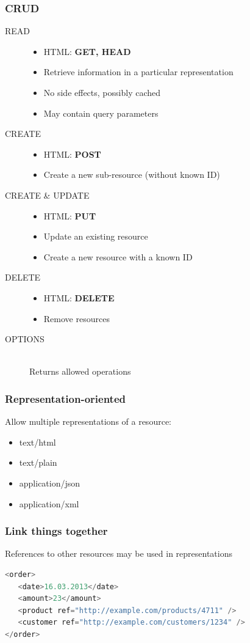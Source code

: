 \documentclass[10pt]{article}
\begin{document}
\subsubsection{CRUD}
\begin{description}
	\item[READ] \hfill
	\begin{itemize}
		\item HTML: \textbf{GET, HEAD}
		\item Retrieve information in a particular representation
		\item No side effects, possibly cached
		\item May contain query parameters
	\end{itemize}
	\item[CREATE] \hfill
	\begin{itemize}
		\item HTML: \textbf{POST}
		\item Create a new sub-resource (without known ID)
	\end{itemize}
	\item[CREATE \& UPDATE] \hfill
	\begin{itemize}
		\item HTML: \textbf{PUT}
		\item Update an existing resource
		\item Create a new resource with a known ID
	\end{itemize}
	\item[DELETE] \hfill
	\begin{itemize}
		\item HTML: \textbf{DELETE}
		\item Remove resources
	\end{itemize}
	\item[OPTIONS] \hfill \\
	Returns allowed operations
\end{description}
\subsubsection{Representation-oriented}
Allow multiple representations of a resource: 
\begin{itemize}
	\item text/html
	\item text/plain
	\item application/json
	\item application/xml
\end{itemize}
\subsubsection{Link things together}
References to other resources may be used in representations
\begin{lstlisting}[language=Java, caption=example, style=JavaStyle]
<order>
   <date>16.03.2013</date>
   <amount>23</amount>
   <product ref="http://example.com/products/4711" />
   <customer ref="http://example.com/customers/1234" />
</order>
\end{lstlisting}
\end{document}
